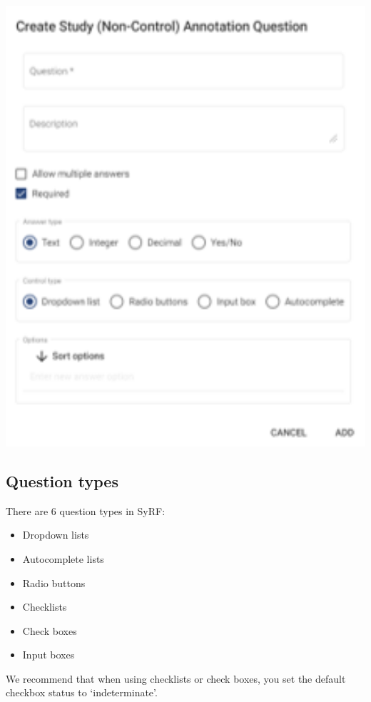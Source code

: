 \documentclass[
]{book}
\providecommand{\tightlist}{%
  \setlength{\itemsep}{0pt}\setlength{\parskip}{0pt}}
\begin{document}
\includegraphics[width=1\textwidth,height=1\textheight]{figs/Fig_Question_dialogue.png}

\hypertarget{question-types}{%
\subsection{Question types}\label{question-types}}

There are 6 question types in SyRF:

\begin{itemize}
\tightlist
\item
  Dropdown lists
\item
  Autocomplete lists
\item
  Radio buttons
\item
  Checklists
\item
  Check boxes
\item
  Input boxes
\end{itemize}

We recommend that when using checklists or check boxes, you set the default checkbox status to `indeterminate'.
\end{document}
